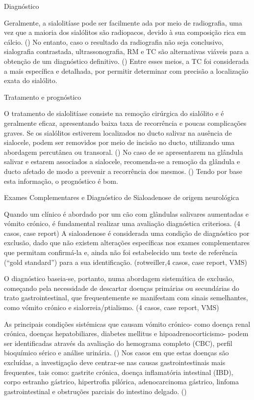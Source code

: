 Diagnóstico



Geralmente, a sialolitíase pode ser facilmente \cite{Kumar2017}ada por meio de radiografia, uma vez que a maioria dos sialólitos são radiopacos, devido à sua composição rica em cálcio. (\cite{Han2016}) No entanto, caso o resultado da radiografia não seja conclusivo, sialografia contrastada, ultrassonografia, RM e TC são alternativas viáveis para a obtenção de um diagnóstico definitivo. (\cite{Han2016}) Entre esses meios, a TC foi considerada a mais específica e detalhada, por permitir determinar com precisão a localização exata do sialólito. \cite{Han2016,perez-ecija_granulomatous_2012}


Tratamento e prognóstico


O tratamento de sialolitíase consiste na remoção cirúrgica do sialólito e é geralmente eficaz, apresentando baixa taxa de recorrência e poucas complicações graves. \cite{Han2016,Ryan2008,perez-ecija_granulomatous_2012} Se os sialólitos estiverem localizados no ducto salivar na ausência de sialocele, podem ser removidos por meio de incisão no ducto, utilizando uma abordagem percutânea ou transoral. (\cite{Han2016}) 
No caso de se apresentarem na glândula salivar e estarem associados a sialocele, recomenda-se a remoção da glândula e ducto afetado de modo a prevenir a recorrência dos mesmos. (\cite{Han2016})
Tendo por base esta informação, o prognóstico é bom.


Exames Complementares e Diagnóstico de Sialoadenose de origem neurológica

Quando um clínico é abordado por um cão com glândulas salivares aumentadas e vómito crónico, é fundamental realizar uma avaliação diagnóstica criteriosa. (4 casos, case report) 
A sialoadenose é considerada uma condição de diagnóstico por exclusão, dado que não existem alterações específicas nos exames complementares que permitam confirmá-la e, ainda não foi estabelecido um teste de referência (“gold standard”) para a sua identificação. (rotweiller,4 casos, case report, VMS) 


O diagnóstico baseia-se, portanto, numa abordagem sistemática de exclusão, começando pela necessidade de descartar doenças primárias ou secundárias do trato gastrointestinal, que frequentemente se manifestam com sinais semelhantes, como vómito crónico e sialorreia/ptialismo. (4 casos, case report, VMS)


As principais condições sistémicas que causam vómito crónico- como doença renal crónica, doenças hepatobiliares, diabetes mellitus e hipoadrenocorticismo- podem ser identificadas através da avaliação do hemograma completo (CBC), perfil bioquímico sérico e análise urinária. (\cite{Leib2010}) Nos casos em que estas doenças são excluídas, a investigação deve centrar-se nas causas gastrointestinais mais frequentes, tais como: gastrite crónica, doença inflamatória intestinal (IBD), corpo estranho gástrico, hipertrofia pilórica, adenocarcinoma gástrico, linfoma gastrointestinal e obstruções parciais do intestino delgado. (\cite{Leib2010})


